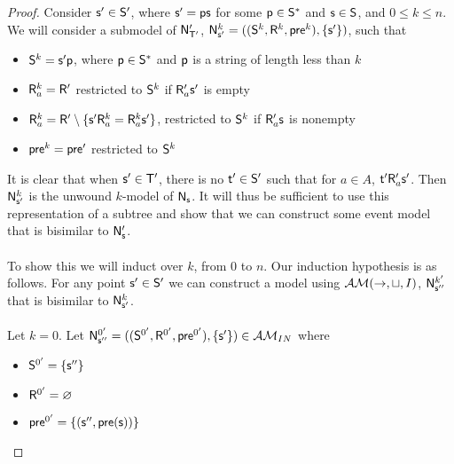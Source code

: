 \begin{proof}
	Consider $\evs' \in \evS'$, where $\evs' = \evp \evs$ for some $\evp \in \evS^\ast$ and $\evs \in
	\evS$, and $0 \leq k \leq n$.
	We will consider a submodel of $\evM'_{\evT'}$, $\evM^k_{\evs'} =
	((\evS^k,\evR^k,\evpr^k),\{\evs'\})$, such that
	\begin{itemize}
		\item $\evS^k = \evs' \evp$, where $\evp \in \evS^\ast$ and $\evp$ is a string of length less
			than $k$
		\item $\evR^k_a = \evR'$ restricted to $\evS^k$ if $\evR'_a \evs'$ is empty
		\item $\evR^k_a = \evR' \setminus \{\evs' \evR^k_a = \evR^k_a \evs'\}$,
    restricted to $\evS^k$ if $\evR'_a \evs$ is nonempty
		\item $\evpr^k = \evpr'$ restricted to $\evS^k$
	\end{itemize}

	It is clear that when $\evs' \in \evT'$, there is no $\evt' \in \evS'$ such
  that for $a \in A$, $\evt' \evR'_a \evs'$.
  Then $\evM^k_{\evs'}$ is the unwound $k$-model of $\evM_\evs$.
	It will thus be sufficient to use this representation of a subtree and show that we can construct
	some event model that is bisimilar to $\evM'_\evs$.\\
	\\
	To show this we will induct over $k$, from 0 to $n$.
	Our induction hypothesis is as follows.
  For any point $\evs' \in \evS'$ we can construct a model using
  $\EM(\to,\sqcup,I)$, $\evM^{k'}_{\evs''}$ that is bisimilar to $\evM^k_{\evs'}$.\\
	\\
	Let $k = 0$.
	Let $\evM^{0'}_{\evs''} = ((\evS^{0'},\evR^{0'},\evpr^{0'}),\{\evs'\}) \in \insaneClass$ where
	\begin{itemize}
		\item $\evS^{0'} = \{\evs''\}$
		\item $\evR^{0'} = \varnothing$
		\item $\evpr^{0'} = \{(\evs'',\evpr(\evs))\}$
	\end{itemize}


\end{proof}

